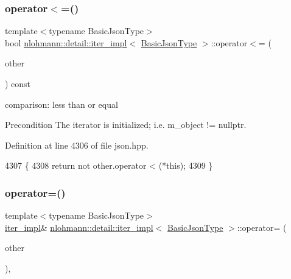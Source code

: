\subsubsection{\texorpdfstring{operator$<$=()}{operator<=()}}
{\footnotesize\ttfamily template$<$typename Basic\+Json\+Type$>$ \\
bool \hyperlink{classnlohmann_1_1detail_1_1iter__impl}{nlohmann\+::detail\+::iter\+\_\+impl}$<$ \hyperlink{classnlohmann_1_1detail_1_1iter__impl_abf18f18793f84b0222aebb5a2a87da7a}{Basic\+Json\+Type} $>$\+::operator$<$= (\begin{DoxyParamCaption}\item[{const \hyperlink{classnlohmann_1_1detail_1_1iter__impl}{iter\+\_\+impl}$<$ \hyperlink{classnlohmann_1_1detail_1_1iter__impl_abf18f18793f84b0222aebb5a2a87da7a}{Basic\+Json\+Type} $>$ \&}]{other }\end{DoxyParamCaption}) const\hspace{0.3cm}{\ttfamily [inline]}}



comparison\+: less than or equal 

\begin{DoxyPrecond}{Precondition}
The iterator is initialized; i.\+e. {\ttfamily m\+\_\+object != nullptr}. 
\end{DoxyPrecond}


Definition at line 4306 of file json.\+hpp.


\begin{DoxyCode}
4307     \{
4308         \textcolor{keywordflow}{return} not other.operator < (*this);
4309     \}
\end{DoxyCode}
\mbox{\label{classnlohmann_1_1detail_1_1iter__impl_a7159ed1cfe7c423a2baef8bea0c94509}} 
\subsubsection{\texorpdfstring{operator=()}{operator=()}}
{\footnotesize\ttfamily template$<$typename Basic\+Json\+Type$>$ \\
\hyperlink{classnlohmann_1_1detail_1_1iter__impl}{iter\+\_\+impl}\& \hyperlink{classnlohmann_1_1detail_1_1iter__impl}{nlohmann\+::detail\+::iter\+\_\+impl}$<$ \hyperlink{classnlohmann_1_1detail_1_1iter__impl_abf18f18793f84b0222aebb5a2a87da7a}{Basic\+Json\+Type} $>$\+::operator= (\begin{DoxyParamCaption}\item[{const \hyperlink{classnlohmann_1_1detail_1_1iter__impl}{iter\+\_\+impl}$<$ typename std\+::remove\+\_\+const$<$ \hyperlink{classnlohmann_1_1detail_1_1iter__impl_abf18f18793f84b0222aebb5a2a87da7a}{Basic\+Json\+Type} $>$\+::type $>$ \&}]{other }\end{DoxyParamCaption})\hspace{0.3cm}{\ttfamily [inline]}, {\ttfamily [noexcept]}}



